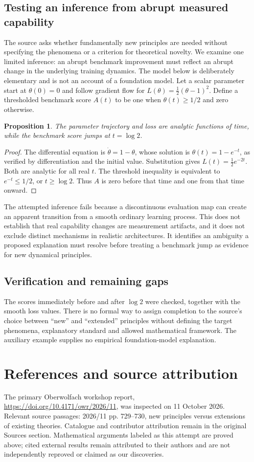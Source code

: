 \documentclass[11pt]{article}
\newtheorem{proposition}{Proposition}
\begin{document}
\subsection{Testing an inference from abrupt measured capability}
The source asks whether fundamentally new principles are needed without specifying the phenomena or a criterion for theoretical novelty. We examine one limited inference: an abrupt benchmark improvement must reflect an abrupt change in the underlying training dynamics. The model below is deliberately elementary and is not an account of a foundation model.
Let a scalar parameter start at $\theta(0)=0$ and follow gradient flow for $L(\theta)=\tfrac12(\theta-1)^2$. Define a thresholded benchmark score $A(t)$ to be one when $\theta(t)\ge1/2$ and zero otherwise.
\begin{proposition}
The parameter trajectory and loss are analytic functions of time, while the benchmark score jumps at $t=\log2$.
\end{proposition}
\begin{proof}
The differential equation is $\dot\theta=1-\theta$, whose solution is $\theta(t)=1-e^{-t}$, as verified by differentiation and the initial value. Substitution gives $L(t)=\tfrac12e^{-2t}$. Both are analytic for all real $t$. The threshold inequality is equivalent to $e^{-t}\le1/2$, or $t\ge\log2$. Thus $A$ is zero before that time and one from that time onward.
\end{proof}
The attempted inference fails because a discontinuous evaluation map can create an apparent transition from a smooth ordinary learning process. This does not establish that real capability changes are measurement artifacts, and it does not exclude distinct mechanisms in realistic architectures. It identifies an ambiguity a proposed explanation must resolve before treating a benchmark jump as evidence for new dynamical principles.
\subsection{Verification and remaining gaps}
The scores immediately before and after $\log2$ were checked, together with the smooth loss values. There is no formal way to assign completion to the source's choice between ``new'' and ``extended'' principles without defining the target phenomena, explanatory standard and allowed mathematical framework. The auxiliary example supplies no empirical foundation-model explanation.

\section{References and source attribution}
The primary Oberwolfach workshop report, \url{https://doi.org/10.4171/owr/2026/11}, was inspected on 11 October 2026. Relevant source passages: 2026/11 pp. 729--730, new principles versus extensions of existing theories. Catalogue and contributor attribution remain in the original Sources section. Mathematical arguments labeled as this attempt are proved above; cited external results remain attributed to their authors and are not independently reproved or claimed as our discoveries.
\end{document}
